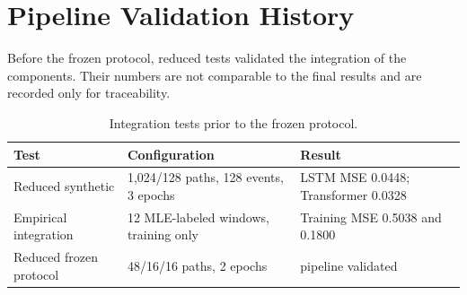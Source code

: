 \chapter{Pipeline Validation History}

Before the frozen protocol, reduced tests validated the integration of the
components. Their numbers are not comparable to the final results and are recorded
only for traceability.

\begin{table}[htbp]
\centering
\caption{Integration tests prior to the frozen protocol.}
\label{tab:historico}
\small
\begin{tabularx}{\linewidth}{lXX}
\toprule
Test & Configuration & Result\\
\midrule
Reduced synthetic & 1,024/128 paths, 128 events, 3 epochs &
  LSTM MSE 0.0448; Transformer 0.0328\\
Empirical integration & 12 MLE-labeled windows, training only &
  Training MSE 0.5038 and 0.1800\\
Reduced frozen protocol & 48/16/16 paths, 2 epochs & pipeline validated\\
\bottomrule
\end{tabularx}
\end{table}
